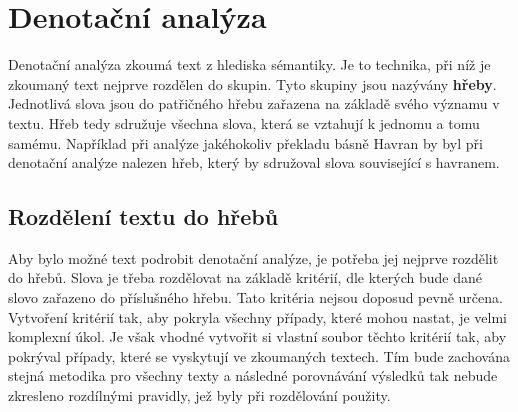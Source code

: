 \documentclass[dp.tex]{subfiles}
\begin{document}
\chapter{Denotační analýza}

Denotační analýza zkoumá text z hlediska sémantiky. Je to technika, při níž je zkoumaný text nejprve rozdělen do skupin. Tyto skupiny jsou  nazývány \textbf{hřeby}. Jednotlivá slova jsou do patřičného hřebu zařazena na základě svého významu v textu. Hřeb tedy sdružuje všechna slova, která se vztahují k jednomu a tomu samému. Například při analýze jakéhokoliv překladu básně Havran by byl při denotační analýze nalezen hřeb, který by sdružoval slova související s havranem.

\section{Rozdělení textu do hřebů}

Aby bylo možné text podrobit denotační analýze, je potřeba jej nejprve rozdělit do hřebů. Slova je třeba rozdělovat na základě kritérií, dle kterých bude dané slovo zařazeno do příslušného hřebu. Tato kritéria nejsou doposud pevně určena. Vytvoření kritérií tak, aby pokryla všechny případy, které mohou nastat, je velmi komplexní úkol. Je však vhodné vytvořit si vlastní soubor těchto kritérií tak, aby pokrýval případy, které se vyskytují ve zkoumaných textech. Tím bude zachována stejná metodika pro všechny texty a následné porovnávání výsledků tak nebude zkresleno rozdílnými pravidly, jež byly při rozdělování použity.
\end{document}
